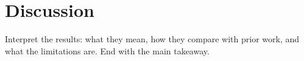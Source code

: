 \section{Discussion}

Interpret the results: what they mean, how they compare with prior work, and
what the limitations are. End with the main takeaway.
